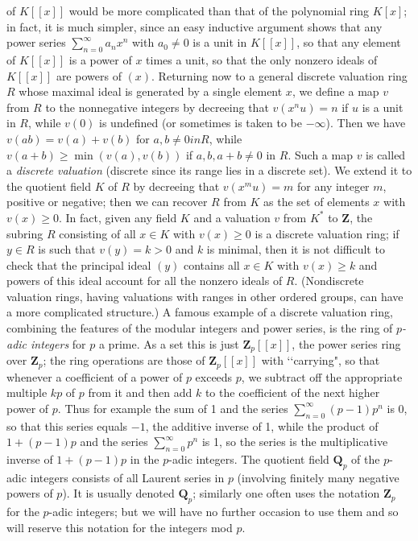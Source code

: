 \documentclass[10pt]{article}
\begin{document}
of $K[[x]]$ would be more complicated than that of the polynomial ring
$K[x]$; in fact, it is much simpler, since an easy inductive argument
shows that any power series $\sum_{n=0}^\infty a_n x^n$ with $a_0\ne0$
is a unit in $K[[x]]$, so that any element of $K[[x]]$ is a power of $x$
times a unit, so that the only nonzero ideals of $K[[x]]$ are powers of
$(x)$. Returning now to a general discrete valuation ring $R$ whose
maximal ideal is generated by a single element $x$, we define a map $v$
from $R$ to the nonnegative integers by decreeing that $v(x^n u) = n$ if
$u$ is a unit in $R$, while $v(0)$ is undefined (or sometimes is taken
to be $-\infty$). Then we have $v(ab) = v(a) + v(b)$ for $a,b\ne0 in R$,
while $v(a+b)\ge\min(v(a),v(b))$ if $a,b,a+b\ne0$ in $R$. Such a map $v$
is called a {\sl discrete valuation} (discrete since its range lies in a
discrete set). We extend it to the quotient field $K$ of $R$ by
decreeing that $v(x^m u) = m$ for any integer $m$, positive or negative;
then we can recover $R$ from $K$ as the set of elements $x$ with
$v(x)\ge0$. In fact, given any field $K$ and a valuation $v$ from $K^*$
to $\mathbf Z$, the subring $R$ consisting of all $x\in K$ with
$v(x)\ge0$ is a discrete valuation ring; if $y\in R$ is such that
$v(y)=k>0$ and $k$ is minimal, then it is not difficult to check that
the principal ideal $(y)$ contains all $x\in K$ with $v(x)\ge k$ and
powers of this ideal account for all the nonzero ideals of $R$.
(Nondiscrete valuation rings, having valuations with ranges in other
ordered groups, can have a more complicated structure.) A famous example
of a discrete valuation ring, combining the features of the modular
integers and power series, is the ring of {\sl $p$-adic integers} for
$p$ a prime. As a set this is just $\mathbf Z_p[[x]]$, the power series
ring over $\mathbf Z_p$; the ring operations are those of $\mathbf
Z_p[[x]]$ with \lq\lq carrying", so that whenever a coefficient of a
power of $p$ exceeds $p$, we subtract off the appropriate multiple $kp$
of $p$ from it and then add $k$ to the coefficient of the next higher
power of $p$. Thus for example the sum of 1 and the series
$\sum_{n=0}^\infty (p-1)p^n$ is 0, so that this series equals $-1$, the
additive inverse of 1, while the product of $1+(p-1)p$ and the series
$\sum_{n=0}^\infty p^n$ is 1, so the series is the multiplicative
inverse of $1+(p-1)p$ in the $p$-adic integers. The quotient field
$\mathbf Q_p$ of the $p$-adic integers consists of all Laurent series in
$p$ (involving finitely many negative powers of $p$). It is usually
denoted $\mathbf Q_p$; similarly one often uses the notation $\mathbf
Z_p$ for the $p$-adic integers; but we will have no further occasion to
use them and so will reserve this notation for the integers mod $p$.
\end{document}
